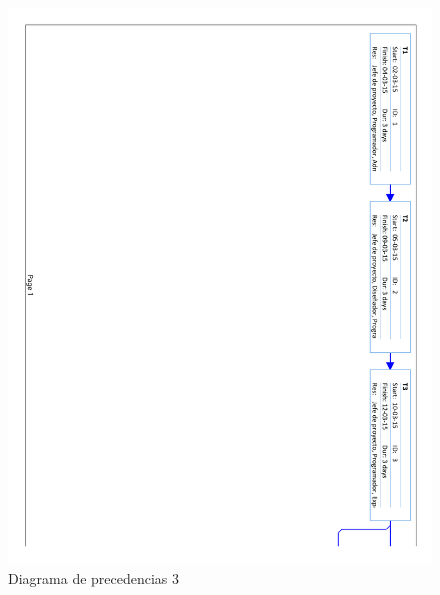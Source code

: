 \begin{figure}[!htbp]
	\centering
	\includegraphics[page=3, scale=.65]{fig/real_network_diagram}
	\caption{Diagrama de precedencias 3}
\end{figure}

